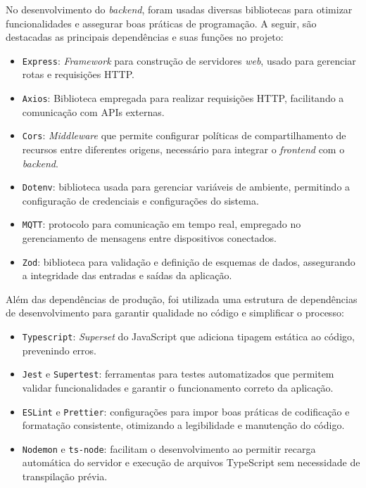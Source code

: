 No desenvolvimento do \textit{backend}, foram usadas diversas bibliotecas para otimizar funcionalidades e assegurar boas práticas de programação. A seguir, são destacadas as principais dependências e suas funções no projeto:

\begin{itemize}
    \item \texttt{Express}: \textit{Framework} para construção de servidores \textit{web}, usado para gerenciar rotas e requisições HTTP.
    \item \texttt{Axios}: Biblioteca empregada para realizar requisições HTTP, facilitando a comunicação com APIs externas.
    \item \texttt{Cors}: \textit{Middleware} que permite configurar políticas de compartilhamento de recursos entre diferentes origens, necessário para integrar o \textit{frontend} com o \textit{backend}.
    \item \texttt{Dotenv}: biblioteca usada para gerenciar variáveis de ambiente, permitindo a configuração de credenciais e configurações do sistema.
    \item \texttt{MQTT}: protocolo para comunicação em tempo real, empregado no gerenciamento de mensagens entre dispositivos conectados.
    \item \texttt{Zod}: biblioteca para validação e definição de esquemas de dados, assegurando a integridade das entradas e saídas da aplicação.
\end{itemize}

Além das dependências de produção, foi utilizada uma estrutura de dependências de desenvolvimento para garantir qualidade no código e simplificar o processo:

\begin{itemize}
    \item \texttt{Typescript}: \textit{Superset} do JavaScript que adiciona tipagem estática ao código, prevenindo erros.
    \item \texttt{Jest} e \texttt{Supertest}: ferramentas para testes automatizados que permitem validar funcionalidades e garantir o funcionamento correto da aplicação.
    \item \texttt{ESLint} e \texttt{Prettier}: configurações para impor boas práticas de codificação e formatação consistente, otimizando a legibilidade e manutenção do código.
    \item \texttt{Nodemon} e \texttt{ts-node}: facilitam o desenvolvimento ao permitir recarga automática do servidor e execução de arquivos TypeScript sem necessidade de transpilação prévia.
\end{itemize}

